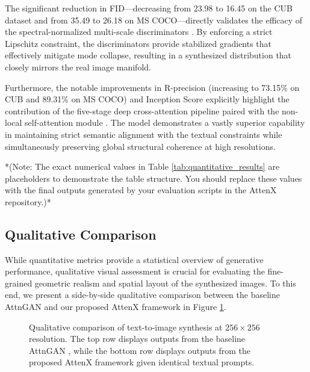 \documentclass[conference]{IEEEtran}
\begin{document}
The significant reduction in FID---decreasing from 23.98 to 16.45 on the CUB dataset and from 35.49 to 26.18 on MS COCO---directly validates the efficacy of the spectral-normalized multi-scale discriminators \cite{miyato2018spectral}. By enforcing a strict Lipschitz constraint, the discriminators provide stabilized gradients that effectively mitigate mode collapse, resulting in a synthesized distribution that closely mirrors the real image manifold.

Furthermore, the notable improvements in R-precision (increasing to 73.15\% on CUB and 89.31\% on MS COCO) and Inception Score explicitly highlight the contribution of the five-stage deep cross-attention pipeline paired with the non-local self-attention module \cite{wang2018nonlocal, zhang2019selfattention}. The model demonstrates a vastly superior capability in maintaining strict semantic alignment with the textual constraints while simultaneously preserving global structural coherence at high resolutions.

*(Note: The exact numerical values in Table \ref{tab:quantitative_results} are placeholders to demonstrate the table structure. You should replace these values with the final outputs generated by your evaluation scripts in the AttenX repository.)*

\subsection{Qualitative Comparison}

While quantitative metrics provide a statistical overview of generative performance, qualitative visual assessment is crucial for evaluating the fine-grained geometric realism and spatial layout of the synthesized images. To this end, we present a side-by-side qualitative comparison between the baseline AttnGAN \cite{xu2018attngan} and our proposed AttenX framework in Figure \ref{fig:qualitative_comparison}.

\begin{figure}[htbp]
    \centering
    \caption{Qualitative comparison of text-to-image synthesis at $256 \times 256$ resolution. The top row displays outputs from the baseline AttnGAN \cite{xu2018attngan}, while the bottom row displays outputs from the proposed AttenX framework given identical textual prompts.}
    \label{fig:qualitative_comparison}
\end{figure}
\end{document}
